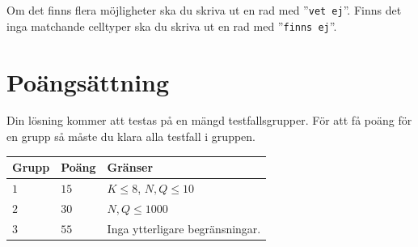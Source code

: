 Om det finns flera möjligheter ska du skriva ut en rad med ''\texttt{vet ej}''.
Finns det inga matchande celltyper ska du skriva ut en rad med ''\texttt{finns ej}''.

\section*{Poängsättning}
Din lösning kommer att testas på en mängd testfallsgrupper.
För att få poäng för en grupp så måste du klara alla testfall i gruppen.

\noindent
\begin{tabular}{| l | l | p{12cm} |}
  \hline
  \textbf{Grupp} & \textbf{Poäng} & \textbf{Gränser} \\ \hline
    $1$     & $15$         & $ K \le 8$, $N, Q \leq 10$ \\ \hline
    $2$     & $30$         & $ N, Q \leq 1000$ \\ \hline
    $3$     & $55$         & Inga ytterligare begränsningar. \\ \hline
\end{tabular}

